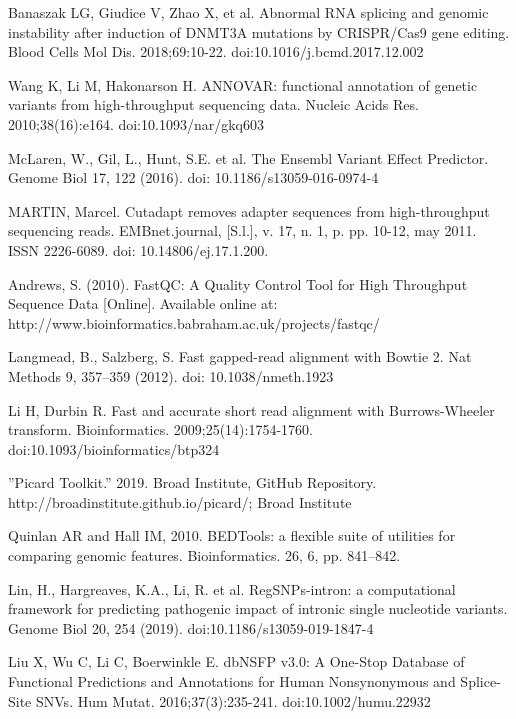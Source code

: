 \documentclass[a4paper,12pt]{article}
\begin{document}
\begin{thebibliography}{100}
Banaszak LG, Giudice V, Zhao X, et al. Abnormal RNA splicing and genomic instability after induction of DNMT3A mutations by CRISPR/Cas9 gene editing. Blood Cells Mol Dis. 2018;69:10-22. doi:10.1016/j.bcmd.2017.12.002


Wang K, Li M, Hakonarson H. ANNOVAR: functional annotation of genetic variants from high-throughput sequencing data. Nucleic Acids Res. 2010;38(16):e164. doi:10.1093/nar/gkq603

McLaren, W., Gil, L., Hunt, S.E. et al. The Ensembl Variant Effect Predictor. Genome Biol 17, 122 (2016). doi: 10.1186/s13059-016-0974-4

MARTIN, Marcel. Cutadapt removes adapter sequences from high-throughput sequencing reads. EMBnet.journal, [S.l.], v. 17, n. 1, p. pp. 10-12, may 2011. ISSN 2226-6089. doi: 10.14806/ej.17.1.200. 

Andrews, S. (2010). FastQC:  A Quality Control Tool for High Throughput Sequence Data [Online]. Available online at: http://www.bioinformatics.babraham.ac.uk/projects/fastqc/

Langmead, B., Salzberg, S. Fast gapped-read alignment with Bowtie 2. Nat Methods 9, 357–359 (2012). doi: 10.1038/nmeth.1923

Li H, Durbin R. Fast and accurate short read alignment with Burrows-Wheeler transform. Bioinformatics. 2009;25(14):1754-1760. doi:10.1093/bioinformatics/btp324

''Picard Toolkit.'' 2019. Broad Institute, GitHub Repository. http://broadinstitute.github.io/picard/; Broad Institute

Quinlan AR and Hall IM, 2010. BEDTools: a flexible suite of utilities for comparing genomic features. Bioinformatics. 26, 6, pp. 841–842.


Lin, H., Hargreaves, K.A., Li, R. et al. RegSNPs-intron: a computational framework for predicting pathogenic impact of intronic single nucleotide variants. Genome Biol 20, 254 (2019). doi:10.1186/s13059-019-1847-4

Liu X, Wu C, Li C, Boerwinkle E. dbNSFP v3.0: A One-Stop Database of Functional Predictions and Annotations for Human Nonsynonymous and Splice-Site SNVs. Hum Mutat. 2016;37(3):235-241. doi:10.1002/humu.22932


\end{thebibliography}
\end{document}
